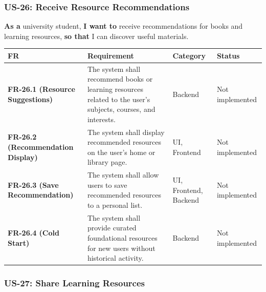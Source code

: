 \documentclass[12pt]{article}
\renewcommand{\baselinestretch}{1.5}
\begin{document}
\hypertarget{sec:us-26-receive-resource-recommendations}{}
\subsubsection*{US-26: Receive Resource Recommendations}
\par\medskip

\textbf{As a} university student, \textbf{I want to} receive recommendations for books and learning resources, \textbf{so that} I can discover useful materials.
\par\medskip

\begingroup
\small
\renewcommand{\baselinestretch}{1.0}\selectfont
\renewcommand{\arraystretch}{1.15}
\setlength{\tabcolsep}{6pt}
\begin{longtable}{|>{\raggedright\arraybackslash}p{}|>{\raggedright\arraybackslash}p{}|>{\raggedright\arraybackslash}p{}|>{\raggedright\arraybackslash}p{}|}
\hline
\textbf{FR} & \textbf{Requirement} & \textbf{Category} & \textbf{Status} \\ \hline
\endhead
\textbf{FR-26.1 (Resource Suggestions)} & The system shall recommend books or learning resources related to the user's subjects, courses, and interests. & Backend & Not implemented \\ \hline
\textbf{FR-26.2 (Recommendation Display)} & The system shall display recommended resources on the user's home or library page. & UI, Frontend & Not implemented \\ \hline
\textbf{FR-26.3 (Save Recommendation)} & The system shall allow users to save recommended resources to a personal list. & UI, Frontend, Backend & Not implemented \\ \hline
\textbf{FR-26.4 (Cold Start)} & The system shall provide curated foundational resources for new users without historical activity. & Backend & Not implemented \\ \hline
\end{longtable}
\endgroup
\par\medskip

\hypertarget{sec:us-27-share-learning-resources}{}
\subsubsection*{US-27: Share Learning Resources}
\par\medskip
\end{document}
